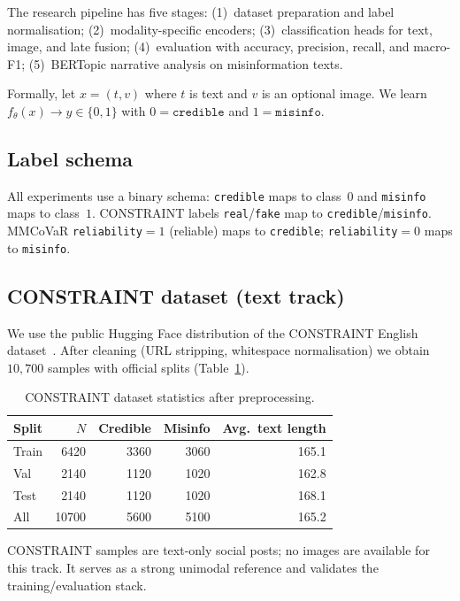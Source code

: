 \documentclass[12pt, a4paper]{report}
\begin{document}
The research pipeline has five stages:
(1)~dataset preparation and label normalisation;
(2)~modality-specific encoders;
(3)~classification heads for text, image, and late fusion;
(4)~evaluation with accuracy, precision, recall, and macro-F1;
(5)~BERTopic narrative analysis on misinformation texts.

Formally, let $x = (t, v)$ where $t$ is text and $v$ is an optional image.
We learn $f_\theta(x) \rightarrow y \in \{0,1\}$ with $0=\texttt{credible}$ and $1=\texttt{misinfo}$.

\subsection{Label schema}

All experiments use a binary schema:
\texttt{credible} maps to class~$0$ and \texttt{misinfo} maps to class~$1$.
CONSTRAINT labels \texttt{real}/\texttt{fake} map to \texttt{credible}/\texttt{misinfo}.
MMCoVaR \texttt{reliability}$=1$ (reliable) maps to \texttt{credible}; \texttt{reliability}$=0$ maps to \texttt{misinfo}.

\subsection{CONSTRAINT dataset (text track)}

We use the public Hugging Face distribution of the CONSTRAINT English dataset~\cite{patwa2021fighting}.
After cleaning (URL stripping, whitespace normalisation) we obtain $10{,}700$ samples with official splits (Table~\ref{tab:constraint-stats}).

\begin{table}[htbp]
\centering
\caption{CONSTRAINT dataset statistics after preprocessing.}
\label{tab:constraint-stats}
\begin{tabular}{lrrrr}
\hline
Split & $N$ & Credible & Misinfo & Avg.\ text length \\
\hline
Train & 6420 & 3360 & 3060 & 165.1 \\
Val   & 2140 & 1120 & 1020 & 162.8 \\
Test  & 2140 & 1120 & 1020 & 168.1 \\
\hline
All   & 10700 & 5600 & 5100 & 165.2 \\
\hline
\end{tabular}
\end{table}

CONSTRAINT samples are text-only social posts; no images are available for this track.
It serves as a strong unimodal reference and validates the training/evaluation stack.
\end{document}

